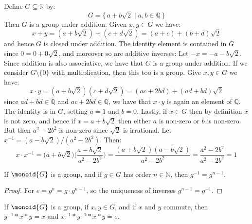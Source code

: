     \begin{example}
        Define $G\subseteq\mathbb{R}$ by:
        \begin{equation}
            G=\{\,a+b\sqrt{2}\;|\;a,b\in\mathbb{Q}\,\}
        \end{equation}
        Then $G$ is a group under addition. Given $x,y\in{G}$ we have:
        \begin{equation}
            x+y=(a+b\sqrt{2})+(c+d\sqrt{2})=(a+c)+(b+d)\sqrt{2}
        \end{equation}
        and hence $G$ is closed under addition. The identity element is
        contained in $G$ since $0=0+0\sqrt{2}$, and moreover so are
        additive inverses: Let $\minus{x}=\minus{a}-b\sqrt{2}$. Since
        addition is also associative, we have that $G$ is a group under
        addition. If we consider $G\setminus\{0\}$ with multiplication, then
        this too is a group. Give $x,y\in{G}$ we have:
        \begin{equation}
            x\cdot{y}=(a+b\sqrt{2})(c+d\sqrt{2})
                =(ac+2bd)+(ad+bd)\sqrt{2}
        \end{equation}
        since $ad+bd\in\mathbb{Q}$ and $ac+2bd\in\mathbb{Q}$, we have that
        $x\cdot{y}$ is again an element of $\mathbb{Q}$. The identity is in
        $G$, setting $a=1$ and $b=0$. Lastly, if $x\in{G}$ then by
        definition $x$ is not zero, and hence if $x=a+b\sqrt{2}$ then either
        $a$ is non-zero or $b$ is non-zero. But then $a^{2}-2b^{2}$ is
        non-zero since $\sqrt{2}$ is irrational. Let
        $x^{\minus{1}}=(a-b\sqrt{2})/(a^{2}-2b^{2})$. Then:
        \begin{equation}
            x\cdot{x}^{\minus{1}}=
            \big(a+b\sqrt{2}\big)\big(\frac{a-b\sqrt{2}}{a^{2}-2b^{2}}\big)
            =\frac{(a+b\sqrt{2})(a-b\sqrt{2})}{a^{2}-2b^{2}}
            =\frac{a^{2}-2b^{2}}{a^{2}-2b^{2}}=1
        \end{equation}
    \end{example}
    \begin{theorem}
        If $\monoid{G}$ is a group, and if $g\in{G}$ has order
        $n\in\mathbb{N}$, then $g^{\minus{1}}=g^{n-1}$.
    \end{theorem}
    \begin{proof}
        For $e=g^{n}=g\cdot{g}^{n-1}$, so the uniqueness of inverses
        $g^{n-1}=g^{\minus{1}}$.
    \end{proof}
    \begin{theorem}
        If $\monoid{G}$ is a group, if $x,y\in{G}$, and if $x$ and $y$
        commute, then $y^{\minus{1}}*x*y=x$ and
        $x^{\minus{1}}*y^{\minus{1}}*x*y=e$.
    \end{theorem}
